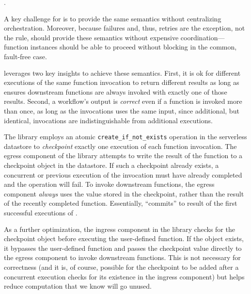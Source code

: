.

A key challenge for \name{} is to provide the same semantics without
centralizing orchestration. Moreover, because failures and, thus, retries are
the exception, not the rule, \name{} should provide these semantics without
expensive coordination---function instances should be able to proceed without
blocking  in the common,
fault-free case.

\name{} leverages two key insights to achieve these semantics.  First, it is ok
for different executions of the same function invocation to return different
results as long as \name{} ensures downstream functions are always invoked
with exactly one of those results. Second, a workflow's output is
\emph{correct} even if a function is invoked more than once, as long as the
invocations uses the same input, since additional, but identical, invocations
are indistinguishable from additional executions.

The \name{} library employs an atomic \texttt{create\_if\_not\_exists} operation
in the serverless datastore to \emph{checkpoint} exactly one execution of each
function invocation. The egress component of the \name{} library attempts to
write the result of the function to a checkpoint object in the datastore. If
such a checkpoint already exists, a concurrent or previous execution of the
invocation must have already completed and the operation will fail. To invoke
downstream functions, the egress component \emph{always} uses the value stored
in the checkpoint, rather than the result of the recently completed function.
Essentially, \name{} ``commits'' to result of the first successful executions of
.

As a further optimization, the ingress component in the \name{} library checks
for the checkpoint object before executing the user-defined function. If the
object exists, it bypasses the user-defined function and passes the checkpoint
value directly to the egress component to invoke downstream functions. This is
not necessary for correctness (and it is, of course, possible for the checkpoint
to be added after a concurrent execution checks for its existence in the ingress
component) but helps reduce computation that we know will go unused.

